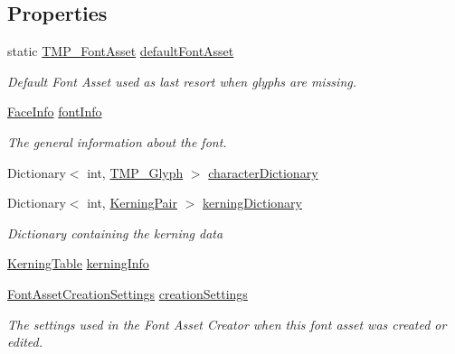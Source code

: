 \subsection*{Properties}
\begin{DoxyCompactItemize}
\item 
static \mbox{\hyperlink{class_t_m_pro_1_1_t_m_p___font_asset}{T\+M\+P\+\_\+\+Font\+Asset}} \mbox{\hyperlink{class_t_m_pro_1_1_t_m_p___font_asset_abeca04093d0ee5e19bd3a1f2527b54fd}{default\+Font\+Asset}}
\begin{DoxyCompactList}\small\item\em Default Font Asset used as last resort when glyphs are missing. \end{DoxyCompactList}\item 
\mbox{\hyperlink{class_t_m_pro_1_1_face_info}{Face\+Info}} \mbox{\hyperlink{class_t_m_pro_1_1_t_m_p___font_asset_a6afd05863cb5c5f39221cc63904b3f90}{font\+Info}}
\begin{DoxyCompactList}\small\item\em The general information about the font. \end{DoxyCompactList}\item 
Dictionary$<$ int, \mbox{\hyperlink{class_t_m_pro_1_1_t_m_p___glyph}{T\+M\+P\+\_\+\+Glyph}} $>$ \mbox{\hyperlink{class_t_m_pro_1_1_t_m_p___font_asset_a9ed6ac03958d8cbf8d243dde765520d5}{character\+Dictionary}}
\item 
Dictionary$<$ int, \mbox{\hyperlink{class_t_m_pro_1_1_kerning_pair}{Kerning\+Pair}} $>$ \mbox{\hyperlink{class_t_m_pro_1_1_t_m_p___font_asset_a0e8bcaaecbbd7d452709fbc92814c92e}{kerning\+Dictionary}}
\begin{DoxyCompactList}\small\item\em Dictionary containing the kerning data \end{DoxyCompactList}\item 
\mbox{\hyperlink{class_t_m_pro_1_1_kerning_table}{Kerning\+Table}} \mbox{\hyperlink{class_t_m_pro_1_1_t_m_p___font_asset_a29e3d4b8a89e5bca2f9b8238257f4cd9}{kerning\+Info}}
\item 
\mbox{\hyperlink{struct_t_m_pro_1_1_font_asset_creation_settings}{Font\+Asset\+Creation\+Settings}} \mbox{\hyperlink{class_t_m_pro_1_1_t_m_p___font_asset_a5add1fb1c5ac1afb72c1f6c5b64f9d8a}{creation\+Settings}}
\begin{DoxyCompactList}\small\item\em The settings used in the Font Asset Creator when this font asset was created or edited. \end{DoxyCompactList}\end{DoxyCompactItemize}


